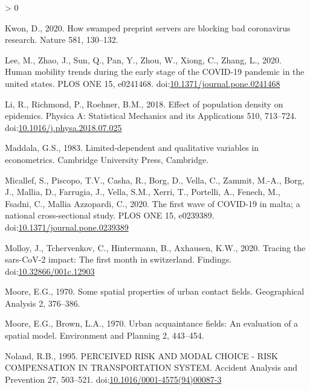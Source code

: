 \documentclass[]{elsarticle} %
\newlength{\cslhangindent}
\newenvironment{CSLReferences}[2] %
 {%
  \setlength{\parindent}{0pt}
  \ifodd #1 \everypar{\setlength{\hangindent}{\cslhangindent}}\ignorespaces\fi
  \ifnum #2 > 0
  \setlength{\parskip}{#2\baselineskip}
  \fi
 }%
 {}
\begin{document}
\begin{CSLReferences}{1}{0}
\leavevmode\hypertarget{ref-Kwon2021swamped}{}%
Kwon, D., 2020. How swamped preprint servers are blocking bad
coronavirus research. Nature 581, 130--132.

\leavevmode\hypertarget{ref-Lee2020human}{}%
Lee, M., Zhao, J., Sun, Q., Pan, Y., Zhou, W., Xiong, C., Zhang, L.,
2020. Human mobility trends during the early stage of the COVID-19
pandemic in the united states. PLOS ONE 15, e0241468.
doi:\href{https://doi.org/10.1371/journal.pone.0241468}{10.1371/journal.pone.0241468}

\leavevmode\hypertarget{ref-Li2018effect}{}%
Li, R., Richmond, P., Roehner, B.M., 2018. Effect of population density
on epidemics. Physica A: Statistical Mechanics and its Applications 510,
713--724.
doi:\href{https://doi.org/10.1016/j.physa.2018.07.025}{10.1016/j.physa.2018.07.025}

\leavevmode\hypertarget{ref-Maddala1983limited}{}%
Maddala, G.S., 1983. Limited-dependent and qualitative variables in
econometrics. Cambridge University Press, Cambridge.

\leavevmode\hypertarget{ref-Micallef2020first}{}%
Micallef, S., Piscopo, T.V., Casha, R., Borg, D., Vella, C., Zammit,
M.-A., Borg, J., Mallia, D., Farrugia, J., Vella, S.M., Xerri, T.,
Portelli, A., Fenech, M., Fsadni, C., Mallia Azzopardi, C., 2020. The
first wave of COVID-19 in malta; a national cross-sectional study. PLOS
ONE 15, e0239389.
doi:\href{https://doi.org/10.1371/journal.pone.0239389}{10.1371/journal.pone.0239389}

\leavevmode\hypertarget{ref-Molloy2020Tracing}{}%
Molloy, J., Tchervenkov, C., Hintermann, B., Axhausen, K.W., 2020.
Tracing the sars-CoV-2 impact: The first month in switzerland. Findings.
doi:\href{https://doi.org/10.32866/001c.12903}{10.32866/001c.12903}

\leavevmode\hypertarget{ref-Moore1970some}{}%
Moore, E.G., 1970. Some spatial properties of urban contact fields.
Geographical Analysis 2, 376--386.

\leavevmode\hypertarget{ref-Moore1970urban}{}%
Moore, E.G., Brown, L.A., 1970. Urban acquaintance fields: An evaluation
of a spatial model. Environment and Planning 2, 443--454.

\leavevmode\hypertarget{ref-Noland1995perceived}{}%
Noland, R.B., 1995. PERCEIVED RISK AND MODAL CHOICE - RISK COMPENSATION
IN TRANSPORTATION SYSTEM. Accident Analysis and Prevention 27, 503--521.
doi:\href{https://doi.org/10.1016/0001-4575(94)00087-3}{10.1016/0001-4575(94)00087-3}


\end{CSLReferences}
\end{document}
